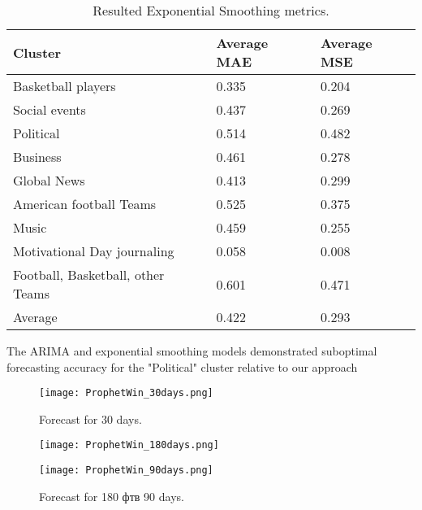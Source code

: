 \begin{table}[h]
\centering
\begin{tabular}{|l|l|l|}
\hline
\textbf{Cluster} & \textbf{Average MAE} & \textbf{Average MSE} \\ \hline
Basketball players & 0.335 & 0.204 \\ \hline
Social events & 0.437 & 0.269 \\ \hline
Political & 0.514 & 0.482 \\ \hline
Business & 0.461 & 0.278 \\ \hline
Global News & 0.413 & 0.299 \\ \hline
American football Teams & 0.525 & 0.375 \\ \hline
Music & 0.459 & 0.255 \\ \hline
Motivational Day journaling & 0.058 & 0.008 \\ \hline
Football, Basketball, other Teams & 0.601 & 0.471 \\ \hline
Average & 0.422 & 0.293 \\ \hline
\end{tabular}
\caption{Resulted Exponential Smoothing metrics.}
\label{tab:ExpSmoothingMetrics}
\end{table}


\newpage
The ARIMA and exponential smoothing models demonstrated suboptimal forecasting accuracy for the "Political" cluster relative to our approach

\begin{figure}[h] 
    \centering
    \texttt{[image: ProphetWin\_30days.png]}
    \label{fig:ProphetPreds}
    \caption{Forecast for 30 days.}
\end{figure}

\begin{figure}[h]
  \begin{minipage}{0.5\textwidth}
    \centering
    \texttt{[image: ProphetWin\_180days.png]}
  \end{minipage}\hfill
  \begin{minipage}{0.5\textwidth}
    \centering
    \texttt{[image: ProphetWin\_90days.png]}
  \end{minipage}
  \caption{Forecast for 180 фтв 90 days.}
\end{figure}

